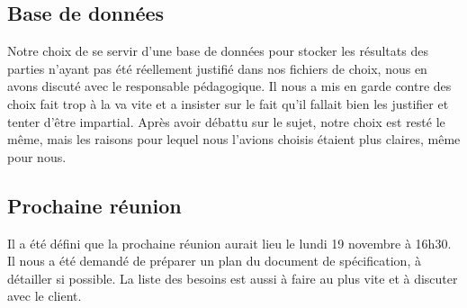 \documentclass{article}
\begin{document}
\subsection*{Base de données}
Notre choix de se servir d'une base de données pour stocker les résultats des parties n'ayant pas été réellement justifié dans nos fichiers de choix, nous en avons discuté avec le responsable pédagogique. Il nous a mis en garde contre des choix fait trop à la va vite et a insister sur le fait qu'il fallait bien les justifier et tenter d'être impartial. Après avoir débattu sur le sujet, notre choix est resté le même, mais les raisons pour lequel nous l'avions choisis étaient plus claires, même pour nous.

\subsection*{Prochaine réunion}
Il a été défini que la prochaine réunion aurait lieu le lundi 19 novembre à 16h30. Il nous a été demandé de préparer un plan du document de spécification, à détailler si possible. La liste des besoins est aussi à faire au plus vite et à discuter avec le client.
\end{document}

